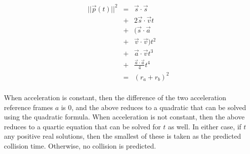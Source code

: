 \documentclass[CEJCS,PDF]{cej} %
\begin{document}
\begin{eqnarray*}
	|| \vec{p}(t) || ^ 2 &=&\vec{s} \cdot \vec{s} \\
	&+&2 \vec{s} \cdot \vec{v} t \\
	&+& (\vec{s} \cdot \vec{a} \\ 
	&+&  \vec{v} \cdot \vec{v}) t ^ 2 \\
	&+& \vec{a} \cdot \vec{v} t ^ 3 \\
	&+& \frac{\vec{a} \cdot \vec{a}}{4} t ^ 4 \\
	&=& (r_a+r_b) ^ 2 \\
\end{eqnarray*}

When acceleration is constant, then the difference of the two acceleration reference frames $a$ is 0, and the above reduces to a quadratic that can be solved using the quadratic formula.
When acceleration is not constant, then the above reduces to a quartic equation that can be solved for $t$ as well.   In either case, if $t$ any positive real solutions, then the smallest of these 
is taken as the predicted collision time.  Otherwise, no collision is predicted. 
\end{document}
